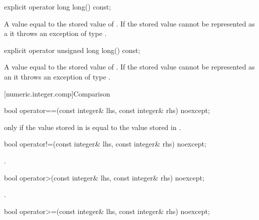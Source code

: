 \begin{itemdecl}
explicit operator long long() const;	
\end{itemdecl}

\begin{itemdescr}
\returns A value equal to the stored value of . If the stored value cannot be represented as a  it throws an exception of type .		
\end{itemdescr}

\begin{itemdecl}
explicit operator unsigned long long() const;	
\end{itemdecl}

\begin{itemdescr}
\returns A value equal to the stored value of . If the stored value cannot be represented as an  it throws an exception of type .		
\end{itemdescr}

[numeric.integer.comp]{Comparison}

\begin{itemdecl}
bool operator==(const integer& lhs, const integer& rhs) noexcept;	
\end{itemdecl}

\begin{itemdescr}
\returns {} only if the value stored in  is equal to the value stored in .		
\end{itemdescr}

\begin{itemdecl}
bool operator!=(const integer& lhs, const integer& rhs) noexcept;	
\end{itemdecl}

\begin{itemdescr}
\returns {}.	
\end{itemdescr}

\begin{itemdecl}
bool operator>(const integer& lhs, const integer& rhs) noexcept;	
\end{itemdecl}

\begin{itemdescr}
\returns {}.		
\end{itemdescr}

\begin{itemdecl}
bool operator>=(const integer& lhs, const integer& rhs) noexcept;	
\end{itemdecl}

